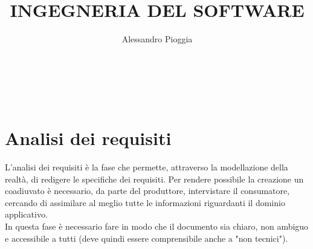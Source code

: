 \documentclass[a4paper,12pt]{report}
\title{\textbf{INGEGNERIA DEL SOFTWARE}}
\author{Alessandro Pioggia}
\begin{document}
	
	\makeatletter
	\begin{titlepage}
		\begin{center}
			{\Huge  \@title }\\[3ex] 
			{\large  \@author}\\[3ex] 
			{\large \@date}
		\end{center}
	\end{titlepage}
	\makeatother
	\thispagestyle{empty}
	\newpage
	
	
	\tableofcontents
	
	
	
	\newpage
	
	\section{Analisi dei requisiti}
	L'analisi dei requisiti è la fase che permette, attraverso la modellazione della realtà, di redigere le specifiche dei requisiti. Per rendere possibile la creazione un coadiuvato è necessario, da parte del produttore, intervistare il consumatore, cercando di assimilare al meglio tutte le informazioni riguardanti il dominio applicativo. \\
	In questa fase è necessario fare in modo che il documento sia chiaro, non ambiguo e accessibile a tutti (deve quindi essere comprensibile anche a "non tecnici"). 
	
	
	
	
	
\end{document}

